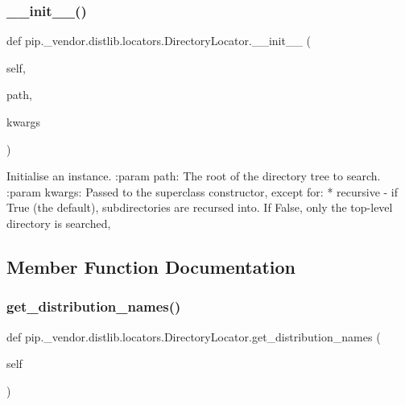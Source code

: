 \subsubsection{\texorpdfstring{\+\_\+\+\_\+init\+\_\+\+\_\+()}{\_\_init\_\_()}}
{\footnotesize\ttfamily def pip.\+\_\+vendor.\+distlib.\+locators.\+Directory\+Locator.\+\_\+\+\_\+init\+\_\+\+\_\+ (\begin{DoxyParamCaption}\item[{}]{self,  }\item[{}]{path,  }\item[{}]{kwargs }\end{DoxyParamCaption})}

\begin{DoxyVerb}Initialise an instance.
:param path: The root of the directory tree to search.
:param kwargs: Passed to the superclass constructor,
       except for:
       * recursive - if True (the default), subdirectories are
         recursed into. If False, only the top-level directory
         is searched,
\end{DoxyVerb}
 

\subsection{Member Function Documentation}
\mbox{\label{classpip_1_1__vendor_1_1distlib_1_1locators_1_1DirectoryLocator_a9ec177430802b7a92b2f458cb66c4d12}} 
\subsubsection{\texorpdfstring{get\+\_\+distribution\+\_\+names()}{get\_distribution\_names()}}
{\footnotesize\ttfamily def pip.\+\_\+vendor.\+distlib.\+locators.\+Directory\+Locator.\+get\+\_\+distribution\+\_\+names (\begin{DoxyParamCaption}\item[{}]{self }\end{DoxyParamCaption})}


